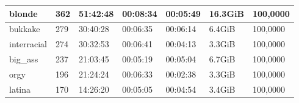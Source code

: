 \begin{table}[]
\begin{tabular}{l|l|l|l|l|l|l}
blonde                                             & 362                                                 & 51:42:48                                                 & 00:08:34                                                & 00:05:49                                               & 16.3GiB                                              & 100,0000                                                      \\ \hline
bukkake                                            & 279                                                 & 30:40:28                                                 & 00:06:35                                                & 00:06:14                                               & 6.4GiB                                               & 100,0000                                                      \\ \hline
interracial                                        & 274                                                 & 30:32:53                                                 & 00:06:41                                                & 00:04:13                                               & 3.3GiB                                               & 100,0000                                                      \\ \hline
big\_ass                                           & 237                                                 & 21:03:45                                                 & 00:05:19                                                & 00:05:04                                               & 6.7GiB                                               & 100,0000                                                      \\ \hline
orgy                                               & 196                                                 & 21:24:24                                                 & 00:06:33                                                & 00:02:38                                               & 3.3GiB                                               & 100,0000                                                      \\ \hline
latina                                             & 170                                                 & 14:26:20                                                 & 00:05:05                                                & 00:04:54                                               & 3.4GiB                                               & 100,0000                                                      \\ \hline

\end{tabular}
\end{table}
